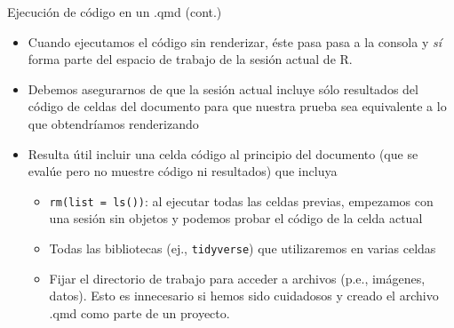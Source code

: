 \documentclass[
  10pt,
  ignorenonframetext,
]{beamer}
\begin{document}
\begin{frame}[fragile]{Ejecución de código en un .qmd (cont.)}
\label{ejecuciuxf3n-de-cuxf3digo-en-un-.qmd-cont.}
\begin{itemize}
\item
  Cuando ejecutamos el código sin renderizar, éste pasa pasa a la
  consola y \emph{sí} forma parte del espacio de trabajo de la sesión
  actual de R.
\item
  Debemos asegurarnos de que la sesión actual incluye sólo resultados
  del código de celdas del documento para que nuestra prueba sea
  equivalente a lo que obtendríamos renderizando
\item
  Resulta útil incluir una celda código al principio del documento (que
  se evalúe pero no muestre código ni resultados) que incluya

  \begin{itemize}
  \item
    \texttt{rm(list\ =\ ls())}: al ejecutar todas las celdas previas,
    empezamos con una sesión sin objetos y podemos probar el código de
    la celda actual
  \item
    Todas las bibliotecas (ej., \texttt{tidyverse}) que utilizaremos en
    varias celdas
  \item
    Fijar el directorio de trabajo para acceder a archivos (p.e.,
    imágenes, datos). Esto es innecesario si hemos sido cuidadosos y
    creado el archivo .qmd como parte de un proyecto.
  \end{itemize}
\end{itemize}
\end{frame}
\end{document}
